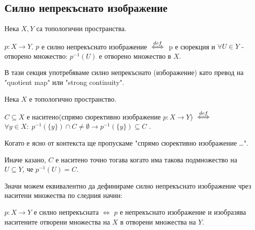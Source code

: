 \subsection{Силно непрекъснато изображение}
\begin{definition}
    Нека $X, Y$ са топологични пространства.
    
    $p: X \to Y$. $p$ е силно непрекъснато изображение ${\overset{def}{\iff}}$ p е сюрекция и $\forall U \in Y$ - отворено множество: $p^{-1}(U)$ е отворено множество в $X$.
\end{definition}
\begin{notation}
    В тази секция употребяваме силно непрекъснато (изборажение) като превод на "quotient map" или "strong continuity".
\end{notation}
\begin{definition}
    Нека $X$ е топологично пространство.
    
    $C \subseteq X$ е наситено(спрямо сюрективно изображение $p: X\to Y$) ${\overset{def}{\iff}}$ $\forall y \in X:\; p^{-1}(\{y\}) \cap C \neq \emptyset \rightarrow p^{-1}(\{y\}) \subseteq C$  .
\end{definition}
\begin{notation}
    Когато е ясно от контекста ще пропускаме "спрямо сюрективно изображение \dots".
\end{notation}
Иначе казано, $C$ е наситено точно тогава когато има такова подмножество на $U \subseteq Y$, че $p^{-1}(U) = C$.

Значи можем еквивалентно да дефинираме силно непрекъснато изображение чрез наситени множества по следния начин:
\begin{proposition}
    $p: X \to Y$ е силно непрекъсната $\iff$ $p$ е непрекъснато изображение и изобразява наситените отворени множества на $X$ в отворени множества на $Y$.
\end{proposition}

